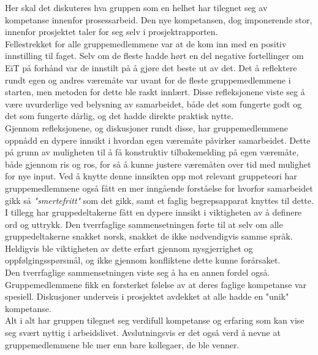 Her skal det diskuteres hva gruppen som en helhet har tilegnet seg av kompetanse innenfor prosessarbeid.
Den nye kompetansen, dog imponerende stor, innenfor prosjektet taler for seg selv i prosjektrapporten.
\\
Fellestrekket for alle gruppemedlemmene var at de kom inn med en positiv innstilling til faget.
Selv om de fleste hadde hørt en del negative fortellinger om EiT på forhånd var de innstilt på å gjøre det beste ut av det.
Det å reflektere rundt egen og andres væremåte var uvant for de fleste gruppemedlemmene i starten, men metoden for dette ble raskt innlært.
Disse refleksjonene viste seg å være uvurderlige ved belysning av samarbeidet, både det som fungerte godt og det som fungerte dårlig, og det hadde direkte praktisk nytte.
\\
Gjennom refleksjonene, og diskusjoner rundt disse, har gruppemedlemmene oppnådd en dypere innsikt i hvordan egen væremåte påvirker samarbeidet.
Dette på grunn av muligheten til å få konstruktiv tilbakemelding på egen væremåte, både gjennom ris og ros, for så å kunne justere væremåten over tid med mulighet for nye input.
Ved å knytte denne innsikten opp mot relevant gruppeteori har gruppemedlemmene også fått en mer inngående forståelse for hvorfor samarbeidet gikk så \emph{"smertefritt"} som det gikk, samt et faglig begrepsapparat knyttes til dette.
\\
I tillegg har gruppedeltakerne fått en dypere innsikt i viktigheten av å definere ord og uttrykk.
Den tverrfaglige sammensetningen førte til at selv om alle gruppedeltakerne snakket norsk, snakket de ikke nødvendigvis samme språk.
Heldigvis ble viktigheten av dette erfart gjennom nysgjerrighet og oppfølgingsspørsmål, og ikke gjennom konfliktene dette kunne forårsaket.
\\
Den tverrfaglige sammensetningen viste seg å ha en annen fordel også.
Gruppemedlemmene fikk en forsterket følelse av at deres faglige kompetanse var spesiell.
Diskusjoner underveis i prosjektet avdekket at alle hadde en "unik" kompetanse.
\\
Alt i alt har gruppen tilegnet seg verdifull kompetanse og erfaring som kan vise seg svært nyttig i arbeidslivet.
Avslutningsvis er det også verd å nevne at gruppemedlemmene ble mer enn bare kollegaer, de ble venner.
\\